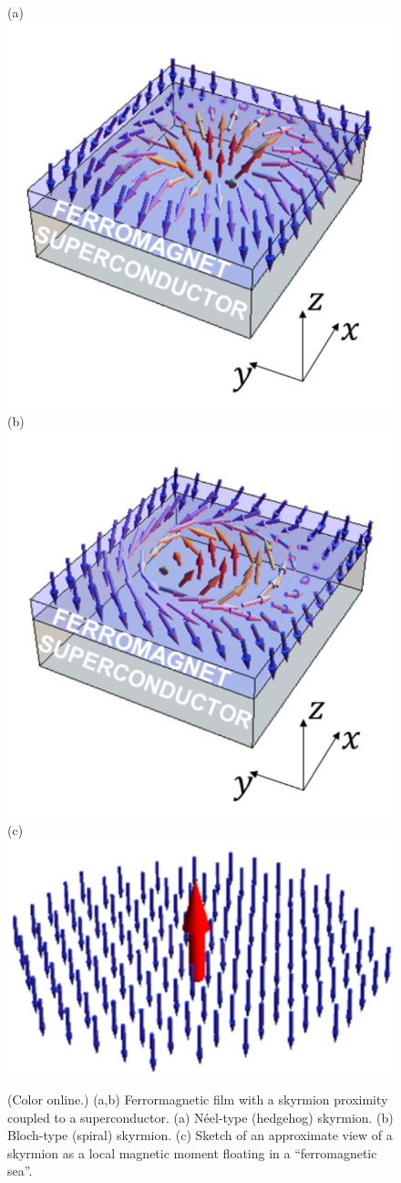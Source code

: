 \documentclass[twocolumn,showpacs,floatfix,longbibliography]{revtex4-1}
\begin{document}
\begin{figure} \centering
(a) \includegraphics[width=0.4\linewidth]{SkyrmA}  
(b) \includegraphics[width=0.4\linewidth]{SkyrmB} \\
(c) \includegraphics[width=0.4\linewidth]{fig1c}
\caption{(Color online.) (a,b) Ferrormagnetic film with a skyrmion proximity coupled to a superconductor. (a) N\'eel-type (hedgehog) skyrmion.  (b) Bloch-type (spiral) skyrmion. (c) Sketch of an approximate view of a skyrmion as a local magnetic moment floating in a ``ferromagnetic sea''.} \label{fig:skyrmion}
\end{figure}
\end{document}
